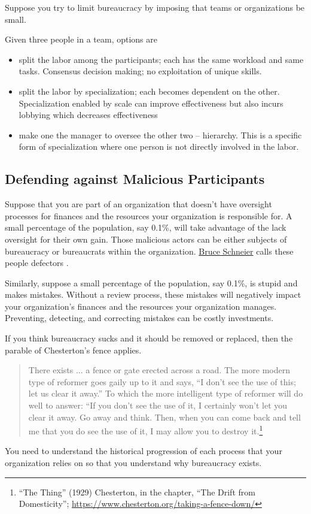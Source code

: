 Suppose you try to limit bureaucracy by imposing that teams or organizations be small.

Given three people in a team, options are
\begin{itemize}
    \item split the labor among the participants; each has the same workload and same tasks. Consensus decision making; no exploitation of unique skills.
    \item split the labor by specialization; each becomes dependent on the other. Specialization enabled by scale can improve effectiveness but also incurs lobbying which decreases effectiveness 
    \item make one the manager to oversee the other two -- hierarchy. This is a specific form of specialization where one person is not directly involved in the labor.
\end{itemize}


\subsection*{Defending against Malicious Participants}

Suppose that you are part of an organization that doesn't have oversight processes for finances and the resources your organization is responsible for. A small percentage of the population, say 0.1\%, will take advantage of the lack oversight for their own gain. Those malicious actors can be either subjects of bureaucracy or bureaucrats within the organization. \href{https://en.wikipedia.org/wiki/Bruce_Schneier}{Bruce Schneier} calls these people defectors \cite{2012_Schneier}.

Similarly, suppose a small percentage of the population, say 0.1\%, is stupid and makes mistakes. Without a review process, these mistakes will negatively impact your organization's finances and the resources your organization manages. Preventing, detecting, and correcting mistakes can be costly investments. 

If you think bureaucracy sucks and it should be removed or replaced, then the parable of Chesterton's fence applies. 
\begin{quote}
There exists ... a fence or gate erected across a road. The more modern type of reformer goes gaily up to it and says, “I don’t see the use of this; let us clear it away.” To which the more intelligent type of reformer will do well to answer: “If you don’t see the use of it, I certainly won’t let you clear it away. Go away and think. Then, when you can come back and tell me that you do see the use of it, I may allow you to destroy it.\footnote{``The Thing'' (1929) Chesterton, in the chapter, ``The Drift from Domesticity''; \href{https://www.chesterton.org/taking-a-fence-down/}{https://www.chesterton.org/taking-a-fence-down/}}
\end{quote}
You need to understand the historical progression of each process that your organization relies on so that you understand why bureaucracy exists.

